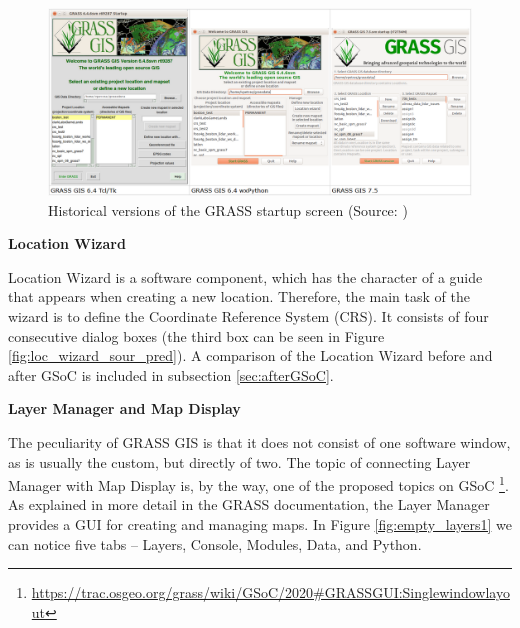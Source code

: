 \documentclass[a4paper,10pt,twoside]{article}
\begin{document}
\vspace{0.3cm}
\begin{figure}[hbt!]
\begin{center}
\includegraphics[width=17cm]{../pictures/verze_startup.png} 
\caption[Historical versions of the GRASS startup screen]{Historical versions of the GRASS startup screen (Source: \cite{intro})}
\label{fig:verze_startup}
\end{center}
\end{figure}

\bigskip
\noindent \textbf {Location Wizard}

\noindent Location Wizard is a software component, which has the
character of a guide that appears when creating a new
location. Therefore, the main task of the wizard is to define the
Coordinate Reference System (CRS). It consists of four consecutive
dialog boxes (the third box can be seen in Figure \ref{fig:loc_wizard_sour_pred}). A comparison of the Location Wizard before and after
GSoC is included in subsection \ref{sec:afterGSoC}.

\bigskip
\noindent \textbf {Layer Manager and Map Display}

\noindent The peculiarity of GRASS GIS is that it does not consist of
one software window, as is usually the custom, but directly of
two. The topic of connecting Layer Manager with Map Display is, by the
way, one of the proposed topics on GSoC
\footnote{\url{https://trac.osgeo.org/grass/wiki/GSoC/2020\#GRASSGUI:Singlewindowlayout}}.
As explained in more detail in the GRASS documentation, the
Layer Manager provides a GUI for creating and managing maps. In Figure
\ref{fig:empty_layers1} we can notice five tabs -- Layers, Console,
Modules, Data, and Python.
\end{document}
